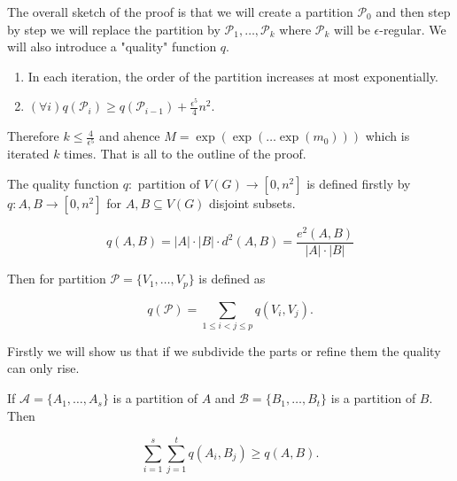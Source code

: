 The overall sketch of the proof is that we will create a partition $\mathcal{P}_{0}$ and then step by step we will replace the partition by $\mathcal{P}_{1}, \dots, \mathcal{P}_{k}$ where $\mathcal{P}_{k}$ will be $\epsilon$-regular. We will also introduce a "quality" function $q$.

\begin{enumerate}
	\item In each iteration, the order of the partition increases at most exponentially.
	\item $(\forall i) q(\mathcal{P}_{i}) \geq q(\mathcal{P}_{i-1}) + \frac{\epsilon^5}{4}n^2$.
\end{enumerate}

Therefore $k \leq \frac{4}{\epsilon^5}$ and ahence $M = \exp(\exp(\dots \exp(m_0)))$ which is iterated $k$ times. That is all to the outline of the proof.

\begin{defn}
	The quality function $q : \text{ partition of } V(G) \to [0, n^2]$ is defined firstly by $q : A, B \to [0,n^2]$ for $A,B \subseteq V(G)$ disjoint subsets.
	
	$$
	q(A,B) = |A| \cdot |B| \cdot d^2(A,B) = \frac{e^2(A,B)}{|A| \cdot |B|}
	$$
	
	Then for partition $\mathcal{P} = \{V_1, \dots, V_p\}$ is defined as
	
	$$
	q(\mathcal{P}) = \sum_{1 \leq i < j \leq p} q(V_i, V_j).
	$$
\end{defn}

Firstly we will show us that if we subdivide the parts or refine them the quality can only rise.

\begin{lemma}
	If $\mathcal{A} = \{A_1, \dots, A_s\}$ is a partition of $A$ and $\mathcal{B} = \{B_1, \dots, B_t\}$ is a partition of $B$. Then
	
	$$
	\sum_{i = 1}^{s} \sum_{j = 1}^{t} q(A_i, B_j) \geq q(A,B).
	$$
\end{lemma}

